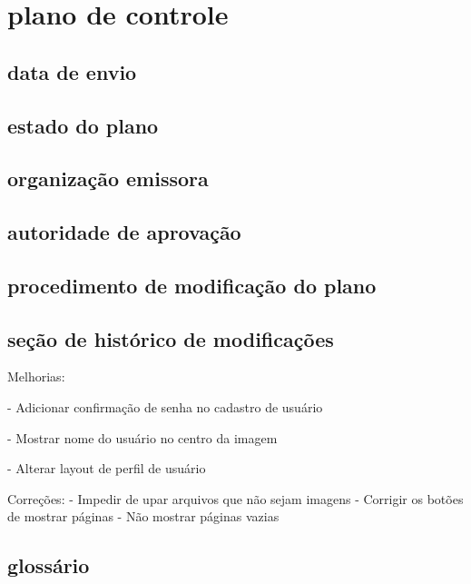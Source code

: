 \chapter{plano de controle}

\section{data de envio}

\section{estado do plano}

\section{organização emissora}

\section{autoridade de aprovação}

\section{procedimento de modificação do plano}

\section{seção de histórico de modificações}

Melhorias:

- Adicionar confirmação de senha no cadastro de usuário

- Mostrar nome do usuário no centro da imagem

- Alterar layout de perfil de usuário

Correções:
- Impedir de upar arquivos que não sejam imagens
- Corrigir os botões de mostrar páginas
- Não mostrar páginas vazias

\section{glossário}

